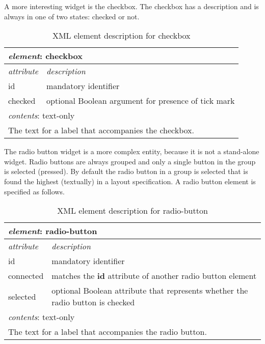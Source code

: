\documentclass{article}
\begin{document}
    A more interesting widget is the checkbox. The checkbox has a description
    and is always in one of two states: checked or not. 
    
    \begin{table}[H]
     \begin{center}
     \begin{tabular}{|l|l|}
       \hline
        \multicolumn{2}{|l|}{\textit{element}: checkbox} \\
       \hline \hline
        \textit{attribute} & \textit{description} \\
       \hline
        id                 & mandatory identifier \\
        checked            & optional Boolean argument for presence of tick mark \\
       \hline \hline
        \multicolumn{2}{|l|}{\textit{contents}: text-only} \\
       \hline
         \multicolumn{2}{|l|}{The text for a label that accompanies the checkbox.} \\
       \hline
     \end{tabular}
     \end{center}
     \label{figure:element_checkbox}
     \caption{XML element description for checkbox}
    \end{table}

    \noindent The radio button widget is a more complex entity, because it is
    not a stand-alone widget. Radio buttons are always grouped and only a
    single button in the group is selected (pressed).  By default the radio
    button in a group is selected that is found the highest (textually) in a
    layout specification. A radio button element is specified as follows.

    \begin{table}[H]
     \begin{center}
     \begin{tabular}{|l|l|}
       \hline
        \multicolumn{2}{|l|}{\textit{element}: radio-button} \\
       \hline \hline
        \textit{attribute} & \textit{description} \\
       \hline
        id                 & mandatory identifier \\
        connected          & matches the \textbf{id} attribute of another radio button element \\
        selected           & optional Boolean attribute that represents whether the radio button is checked \\
       \hline \hline
        \multicolumn{2}{|l|}{\textit{contents}: text-only} \\
       \hline
         \multicolumn{2}{|l|}{The text for a label that accompanies the radio button.} \\
       \hline
     \end{tabular}
     \end{center}
     \label{figure:element_radio_button}
     \caption{XML element description for radio-button}
    \end{table}
\end{document}
